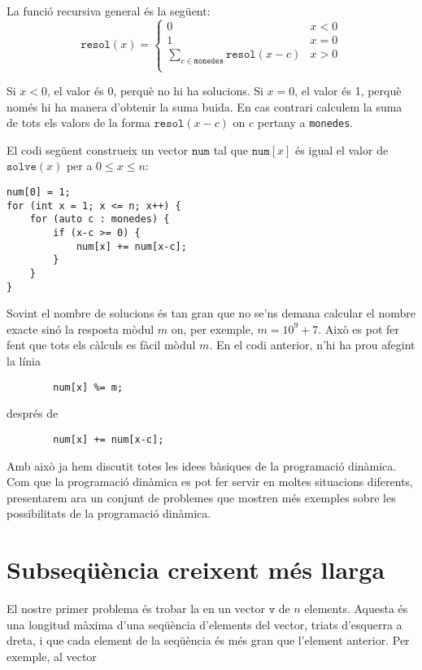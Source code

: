 La funció recursiva general és la següent:
\begin{equation}
    \texttt{resol}(x) = \begin{cases}
               0 & x < 0\\
               1 & x = 0\\
               \sum_{c \in \texttt{monedes}} \texttt{resol}(x-c) & x > 0 \\
           \end{cases}
\end{equation}

Si $x<0$, el valor és 0, perquè no hi ha solucions.
Si $x=0$, el valor és 1, perquè només hi ha manera
d'obtenir la suma buida.
En cas contrari calculem la suma de tots els valors
de la forma $\texttt{resol}(x-c)$ on $c$ pertany a \texttt{monedes}.

El codi següent construeix un vector
$\texttt{num}$ tal que
$\texttt{num}[x]$ és igual
el valor de $\texttt{solve}(x)$
per a $0 \le x \le n$:

\begin{lstlisting}
num[0] = 1;
for (int x = 1; x <= n; x++) {
    for (auto c : monedes) {
        if (x-c >= 0) {
            num[x] += num[x-c];
        }
    }
}
\end{lstlisting}

Sovint el nombre de solucions és tan gran
que no se'ns demana calcular el nombre exacte
sinó la resposta mòdul $m$ on, per exemple, $m=10^9+7$.
Això es pot fer fent que tots els càlculs es fàcil mòdul $m$.
En el codi anterior, n'hi ha prou afegint la línia
\begin{lstlisting}
        num[x] %= m;
\end{lstlisting}
després de
\begin{lstlisting}
        num[x] += num[x-c];
\end{lstlisting}

Amb això ja hem discutit totes les idees bàsiques
de la programació dinàmica. Com que la programació
dinàmica es pot fer servir
en moltes situacions diferents,
presentarem ara un conjunt de problemes
que mostren més exemples sobre les
possibilitats de la programació dinàmica.

\section{Subseqüència creixent més llarga}


El nostre primer problema és trobar la
en un vector $\texttt{v}$ de $n$ elements.
Aquesta és una longitud màxima
d'una seqüència d'elements del vector, triats
d'esquerra a dreta,
i que cada element de la seqüència és més gran
que l'element anterior.
Per exemple, al vector

